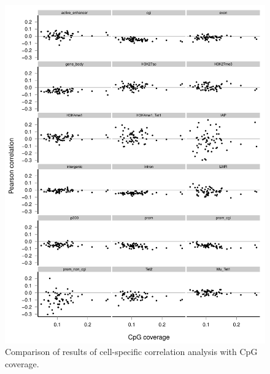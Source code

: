 \begin{figure}[htbp!]
\centering
\includegraphics[width=1.0\textwidth]{cell_r_cov}
\caption{Comparison of results of cell-specific correlation analysis with CpG coverage.}
\label{fig:mt_cell_r_cov}
\end{figure}

